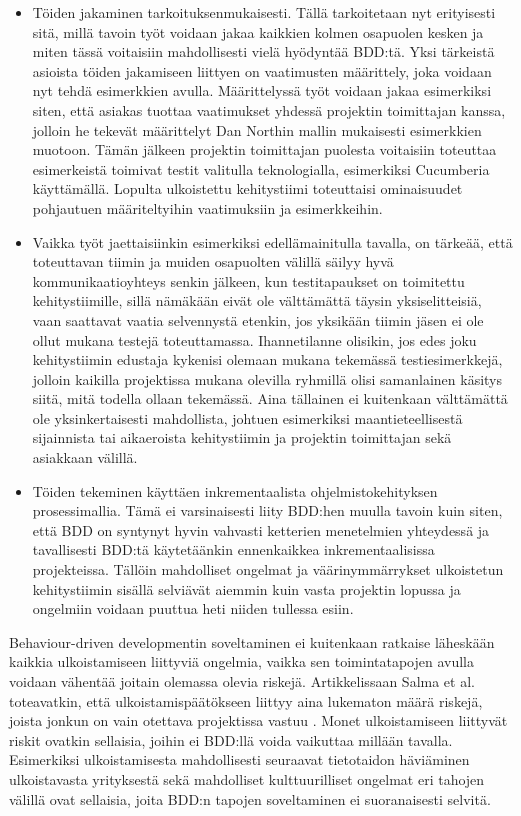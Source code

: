 \documentclass[finnish,nonumbib,nocopyright]{gradu2}
\begin{document}
\begin{itemize}
\item Töiden jakaminen tarkoituksenmukaisesti. Tällä tarkoitetaan nyt erityisesti sitä, millä tavoin työt voidaan jakaa kaikkien kolmen osapuolen kesken ja miten tässä voitaisiin mahdollisesti vielä hyödyntää BDD:tä. Yksi tärkeistä asioista töiden jakamiseen liittyen on vaatimusten määrittely, joka voidaan nyt tehdä esimerkkien avulla. Määrittelyssä työt voidaan jakaa esimerkiksi siten, että asiakas tuottaa vaatimukset yhdessä projektin toimittajan kanssa, jolloin he tekevät määrittelyt Dan Northin mallin \cite{bddintro} mukaisesti esimerkkien muotoon. Tämän jälkeen projektin toimittajan puolesta voitaisiin toteuttaa esimerkeistä toimivat testit valitulla teknologialla, esimerkiksi Cucumberia käyttämällä. Lopulta ulkoistettu kehitystiimi toteuttaisi ominaisuudet pohjautuen määriteltyihin vaatimuksiin ja esimerkkeihin.  
\item Vaikka työt jaettaisiinkin esimerkiksi edellämainitulla tavalla, on tärkeää, että toteuttavan tiimin ja muiden osapuolten välillä säilyy hyvä kommunikaatioyhteys senkin jälkeen, kun testitapaukset on toimitettu kehitystiimille, sillä nämäkään eivät ole välttämättä täysin yksiselitteisiä, vaan saattavat vaatia selvennystä etenkin, jos yksikään tiimin jäsen ei ole ollut mukana testejä toteuttamassa. Ihannetilanne olisikin, jos edes joku kehitystiimin edustaja kykenisi olemaan mukana tekemässä testiesimerkkejä, jolloin kaikilla projektissa mukana olevilla ryhmillä olisi samanlainen käsitys siitä, mitä todella ollaan tekemässä. Aina tällainen ei kuitenkaan välttämättä ole yksinkertaisesti mahdollista, johtuen esimerkiksi maantieteellisestä sijainnista tai aikaeroista kehitystiimin ja projektin toimittajan sekä asiakkaan välillä.
\item Töiden tekeminen käyttäen inkrementaalista ohjelmistokehityksen prosessimallia. Tämä ei varsinaisesti liity BDD:hen muulla tavoin kuin siten, että BDD on syntynyt hyvin vahvasti ketterien menetelmien yhteydessä ja tavallisesti BDD:tä käytetäänkin ennenkaikkea inkrementaalisissa projekteissa. Tällöin mahdolliset ongelmat ja väärinymmärrykset ulkoistetun kehitystiimin sisällä selviävät aiemmin kuin vasta projektin lopussa ja ongelmiin voidaan puuttua heti niiden tullessa esiin.
\end{itemize}  

Behaviour-driven developmentin soveltaminen ei kuitenkaan ratkaise läheskään kaikkia ulkoistamiseen liittyviä ongelmia, vaikka sen toimintatapojen avulla voidaan vähentää joitain olemassa olevia riskejä. Artikkelissaan Salma et al. toteavatkin, että ulkoistamispäätökseen liittyy aina lukematon määrä riskejä, joista jonkun on vain otettava projektissa vastuu \cite{qualityrisk}. Monet ulkoistamiseen liittyvät riskit ovatkin sellaisia, joihin ei BDD:llä voida vaikuttaa millään tavalla. Esimerkiksi ulkoistamisesta mahdollisesti seuraavat tietotaidon häviäminen ulkoistavasta yrityksestä sekä mahdolliset kulttuurilliset ongelmat eri tahojen välillä ovat sellaisia, joita BDD:n tapojen soveltaminen ei suoranaisesti selvitä. 
\end{document}
